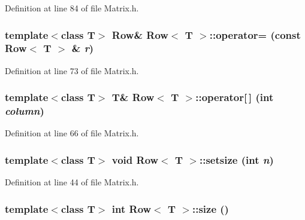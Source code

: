Definition at line 84 of file Matrix.h.

\hypertarget{classRow_a877484e061eef2a179cc28d30b3ec542}{
\subsubsection[{operator=}]{\setlength{\rightskip}{0pt plus 5cm}template$<$class T$>$ {\bf Row}\& {\bf Row}$<$ T $>$::operator= (const {\bf Row}$<$ T $>$ \& {\em r})}}
\label{classRow_a877484e061eef2a179cc28d30b3ec542}


Definition at line 73 of file Matrix.h.

\hypertarget{classRow_a7f371e29268ff2a5e508b32229250d8d}{
\subsubsection[{operator[]}]{\setlength{\rightskip}{0pt plus 5cm}template$<$class T$>$ T\& {\bf Row}$<$ T $>$::operator\mbox{[}$\,$\mbox{]} (int {\em column})}}
\label{classRow_a7f371e29268ff2a5e508b32229250d8d}


Definition at line 66 of file Matrix.h.

\hypertarget{classRow_aebdf0fa4ce1946b8d9ef3c6f266edb7d}{
\subsubsection[{setsize}]{\setlength{\rightskip}{0pt plus 5cm}template$<$class T$>$ void {\bf Row}$<$ T $>$::setsize (int {\em n})}}
\label{classRow_aebdf0fa4ce1946b8d9ef3c6f266edb7d}


Definition at line 44 of file Matrix.h.

\hypertarget{classRow_ac3239fe892db0029206a7e0d888595d1}{
\subsubsection[{size}]{\setlength{\rightskip}{0pt plus 5cm}template$<$class T$>$ int {\bf Row}$<$ T $>$::size ()}}
\label{classRow_ac3239fe892db0029206a7e0d888595d1}


